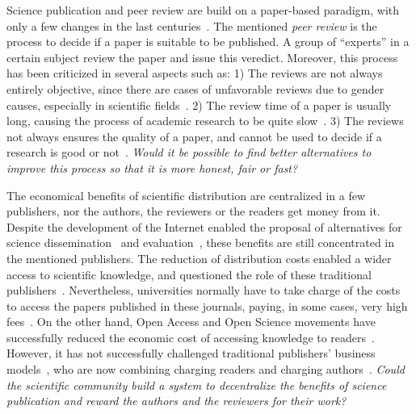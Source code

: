 Science publication and peer review are build on a paper-based paradigm, with
only a few changes in the last centuries~\cite{spier2002history}. The mentioned
\emph{peer review} is the process to decide if a paper is suitable to be
published. A group of ``experts'' in a certain subject review the paper and
issue this veredict. Moreover, this process has been criticized in several
aspects such as: 1) The reviews are not always entirely objective, since there
are cases of unfavorable reviews due to gender causes, especially in scientific
fields~\cite{wenneras2001nepotism}. 2) The review time of a paper is usually
long, causing the process of academic research to be quite
slow~\cite{huisman2017duration}. 3) The reviews not always ensures the quality
of a paper, and cannot be used to decide if a research is good or
not~\cite{goldbeck1999evidence}. \emph{Would it be possible to find better
  alternatives to improve this process so that it is more honest, fair or fast?}

The economical benefits of scientific distribution are centralized in a few
publishers, nor the authors, the reviewers or the readers get money from it.
Despite the development of the Internet enabled the proposal of alternatives for
science dissemination~\cite{eysenbach2006citation} and
evaluation~\cite{walker_emerging_2015}, these benefits are still concentrated in
the mentioned publishers. The reduction of distribution costs enabled a wider
access to scientific knowledge, and questioned the role of these traditional
publishers~\cite{ReinventingRigor}. Nevertheless, universities normally have to
take charge of the costs to access the papers published in these journals,
paying, in some cases, very high fees~\cite{bergstrom2004costs}. On the other
hand, Open Access and Open Science movements have successfully reduced the
economic cost of accessing knowledge to readers~\cite{evans2009open}. However,
it has not successfully challenged traditional publishers' business
models~\cite{lariviere2015oligopoly}, who are now combining charging readers and
charging authors~\cite{van2013true}. \emph{Could the scientific community build
  a system to decentralize the benefits of science publication and reward the
  authors and the reviewers for their work?}

